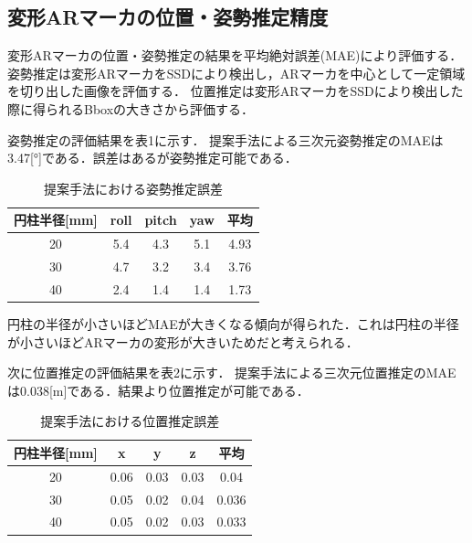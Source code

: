 \documentclass[a4j,twocolumn,10pt]{jarticle}
\begin{document}
\subsection{変形ARマーカの位置・姿勢推定精度}
変形ARマーカの位置・姿勢推定の結果を平均絶対誤差(MAE)により評価する．
姿勢推定は変形ARマーカをSSDにより検出し，ARマーカを中心として一定領域を切り出した画像を評価する．
位置推定は変形ARマーカをSSDにより検出した際に得られるBboxの大きさから評価する．
\par 
姿勢推定の評価結果を表1に示す．
提案手法による三次元姿勢推定のMAEは3.47[$°$]である．誤差はあるが姿勢推定可能である．


\begin{table}[h]
        \vspace{0zh}
          \begin{center}
            \caption{提案手法における姿勢推定誤差}
            \vspace{-1zh}
            \label{hyouka}
            \begin{tabular}{c|c|c|c|c} \hline
              円柱半径[mm]   & roll& pitch & yaw&平均 \\ \hline
              20& 5.4 & 4.3 & 5.1 &4.93\\ \hline
              30&4.7 & 3.2 & 3.4& 3.76 \\ \hline
              40&2.4 &1.4  &1.4&1.73 \\ \hline
              \end{tabular}
          \end{center}
        \vspace{-2zh}
\end{table}

円柱の半径が小さいほどMAEが大きくなる傾向が得られた．これは円柱の半径が小さいほどARマーカの変形が大きいためだと考えられる．\par 
次に位置推定の評価結果を表2に示す．
提案手法による三次元位置推定のMAEは0.038[m]である．結果より位置推定が可能である．

\begin{table}[h]
        \vspace{0zh}
          \begin{center}
            \caption{提案手法における位置推定誤差}
				\vspace{-1zh}
            \label{hyouka}
            \begin{tabular}{c|c|c|c|c} \hline
              円柱半径[mm]   & x& y & z&平均 \\ \hline
              20& 0.06 & 0.03 & 0.03 & 0.04\\ \hline
              30& 0.05 & 0.02 & 0.04 & 0.036 \\ \hline
              40& 0.05 & 0.02 & 0.03 & 0.033 \\ \hline
              \end{tabular}
          \end{center}
        \vspace{-2zh}
\end{table}
\end{document}
